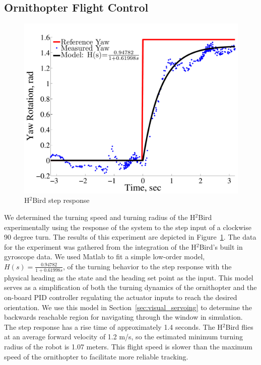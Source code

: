 \documentclass{aamas2013}
\begin{document}
\subsection{Ornithopter Flight Control}
\label{sec:flight_control}
\begin{figure}[tb]
\centering
\includegraphics[width=\linewidth]{figures/step_response_total.pdf}
\caption{H$^2$Bird step response}
\label{fig:step_response}
\end{figure}

We determined the turning speed and turning radius of the H$^2$Bird
experimentally using the response of the system to the step input of a
clockwise 90 degree turn. The results of this experiment are depicted in
Figure~\ref{fig:step_response}. The data for the experiment was gathered from
the integration of the H$^2$Bird's built in gyroscope data. We used Matlab to
fit a simple low-order model, $H(s) = \frac{0.94782}{1+0.61998s}$, of the
turning behavior to the step response with the physical heading as the state
and the heading set point as the input. This model serves as a simplification
of both the turning dynamics of the ornithopter and the on-board PID
controller regulating the actuator inputs to reach the desired orientation. We
use this model in Section~\ref{sec:visual_servoing} to determine the backwards
reachable region for navigating through the window in simulation.
\\
The step response has a rise time of approximately 1.4 seconds. The H$^2$Bird
flies at an average forward velocity of 1.2 m/s, so the estimated minimum
turning radius of the robot is 1.07 meters. This flight speed is slower than
the maximum speed of the ornithopter to facilitate more reliable tracking.
\end{document}
